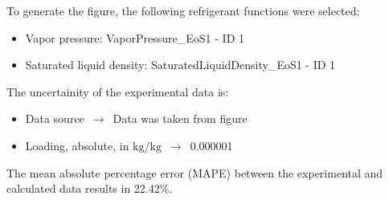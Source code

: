 To generate the figure, the following refrigerant functions were selected:
\begin{itemize}
\item Vapor pressure: VaporPressure\_EoS1 - ID 1
\item Saturated liquid density: SaturatedLiquidDensity\_EoS1 - ID 1
\end{itemize}

The uncertainity of the experimental data is:
\begin{itemize}
\item Data source $\,\to\,$ Data was taken from figure
\item Loading, absolute, in $\si{\kilogram\per\kilogram}$ $\,\to\,$ 0.000001
\end{itemize}

The mean absolute percentage error (MAPE) between the experimental and calculated data results in 22.42\%.
\FloatBarrier
\newpage

